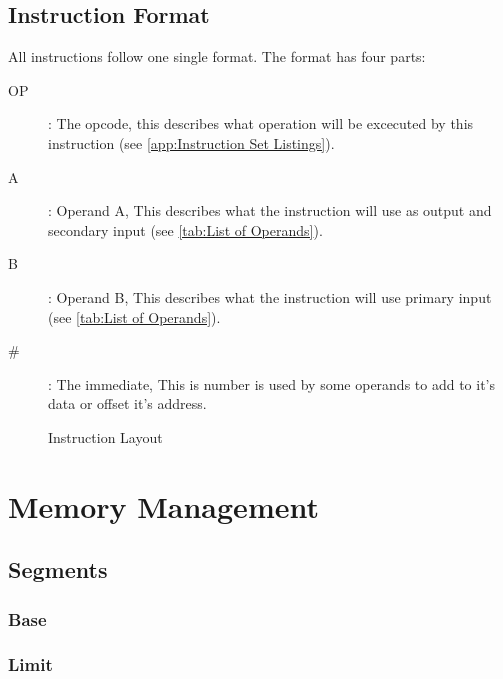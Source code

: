 \documentclass[oneside, a4paper]{memoir}
\begin{document}
\section{Instruction Format}
All instructions follow one single format. The format has four parts:
\begin{description}
\item[OP]: The opcode, this describes what operation will be excecuted by this instruction (see \autoref{app:Instruction Set Listings}).
\item[A]: Operand A, This describes what the instruction will use as output and secondary input (see \autoref{tab:List of Operands}).
\item[B]: Operand B, This describes what the instruction will use primary input (see \autoref{tab:List of Operands}).
\item[\#]: The immediate, This is number is used by some operands to add to it's data or offset it's address.
\end{description}
\begin{figure}[h!]
\begin{center}
\caption{Instruction Layout}
\end{center}
\end{figure}

\chapter{Memory Management}
\label{ch:Memory Management}
\section{Segments}
\subsection{Base}
\subsection{Limit}
\end{document}
